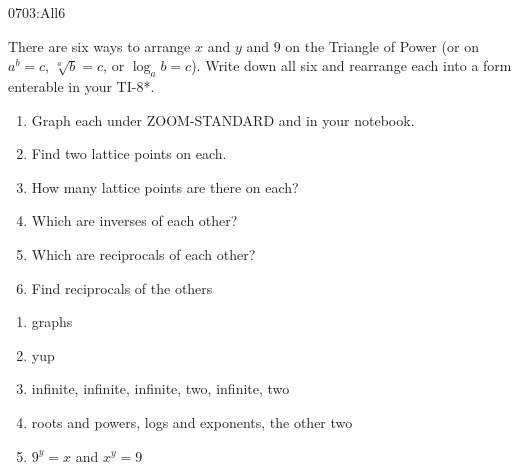 \begin{defproblem}{0703:All6}
\begin{onlyproblem}
There are six ways to arrange $x$ and $y$ and $9$
on the Triangle of Power (or on $a^b=c$, $\sqrt[a]{b}=c$, or $\log_a{b}=c$).
Write down all six and rearrange each into a form
enterable in your TI-8*.  
\begin{enumerate}
\item Graph each under ZOOM-STANDARD and in your notebook.
\item Find two lattice points on each.
\item How many lattice points are there on each?
\item Which are inverses of each other?
\item Which are reciprocals of each other?
\item Find reciprocals of the others
\end{enumerate}
\end{onlyproblem}
\begin{onlysolution}
\begin{enumerate}
\item graphs
\item yup
\item infinite, infinite, infinite, two, infinite, two
\item roots and powers, logs and exponents, the other two
\item $9^y=x$ and $x^y=9$
\end{enumerate}
\end{onlysolution}
\end{defproblem}




